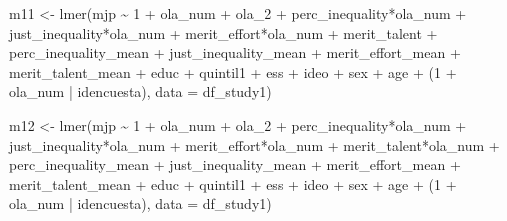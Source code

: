 \documentclass[
  12pt,
  letterpaper,
  DIV=11,
  numbers=noendperiod]{scrartcl}
\newenvironment{Shaded}{\begin{snugshade}}{\end{snugshade}}
\newcommand{\AttributeTok}[1]{\textcolor[rgb]{0.40,0.45,0.13}{#1}}
\newcommand{\DecValTok}[1]{\textcolor[rgb]{0.68,0.00,0.00}{#1}}
\newcommand{\FunctionTok}[1]{\textcolor[rgb]{0.28,0.35,0.67}{#1}}
\newcommand{\NormalTok}[1]{\textcolor[rgb]{0.00,0.23,0.31}{#1}}
\newcommand{\OtherTok}[1]{\textcolor[rgb]{0.00,0.23,0.31}{#1}}
\newcommand{\SpecialCharTok}[1]{\textcolor[rgb]{0.37,0.37,0.37}{#1}}
\begin{document}
\begin{Shaded}
\begin{Highlighting}[]
\NormalTok{m11 }\OtherTok{\textless{}{-}} \FunctionTok{lmer}\NormalTok{(mjp }\SpecialCharTok{\textasciitilde{}} \DecValTok{1} \SpecialCharTok{+}\NormalTok{ ola\_num }\SpecialCharTok{+}\NormalTok{ ola\_2 }\SpecialCharTok{+}\NormalTok{ perc\_inequality}\SpecialCharTok{*}\NormalTok{ola\_num }\SpecialCharTok{+}\NormalTok{ just\_inequality}\SpecialCharTok{*}\NormalTok{ola\_num }\SpecialCharTok{+}\NormalTok{ merit\_effort}\SpecialCharTok{*}\NormalTok{ola\_num }\SpecialCharTok{+}\NormalTok{ merit\_talent }\SpecialCharTok{+}\NormalTok{ perc\_inequality\_mean }\SpecialCharTok{+}\NormalTok{ just\_inequality\_mean }\SpecialCharTok{+}\NormalTok{ merit\_effort\_mean }\SpecialCharTok{+}\NormalTok{ merit\_talent\_mean }\SpecialCharTok{+}\NormalTok{ educ }\SpecialCharTok{+}\NormalTok{ quintil1 }\SpecialCharTok{+}\NormalTok{ ess }\SpecialCharTok{+}\NormalTok{ ideo }\SpecialCharTok{+}\NormalTok{ sex }\SpecialCharTok{+}\NormalTok{ age }\SpecialCharTok{+}\NormalTok{ (}\DecValTok{1} \SpecialCharTok{+}\NormalTok{ ola\_num }\SpecialCharTok{|}\NormalTok{ idencuesta),}
                \AttributeTok{data =}\NormalTok{ df\_study1)}

\NormalTok{m12 }\OtherTok{\textless{}{-}} \FunctionTok{lmer}\NormalTok{(mjp }\SpecialCharTok{\textasciitilde{}} \DecValTok{1} \SpecialCharTok{+}\NormalTok{ ola\_num }\SpecialCharTok{+}\NormalTok{ ola\_2 }\SpecialCharTok{+}\NormalTok{ perc\_inequality}\SpecialCharTok{*}\NormalTok{ola\_num }\SpecialCharTok{+}\NormalTok{ just\_inequality}\SpecialCharTok{*}\NormalTok{ola\_num }\SpecialCharTok{+}\NormalTok{ merit\_effort}\SpecialCharTok{*}\NormalTok{ola\_num }\SpecialCharTok{+}\NormalTok{ merit\_talent}\SpecialCharTok{*}\NormalTok{ola\_num }\SpecialCharTok{+}\NormalTok{ perc\_inequality\_mean }\SpecialCharTok{+}\NormalTok{ just\_inequality\_mean }\SpecialCharTok{+}\NormalTok{ merit\_effort\_mean }\SpecialCharTok{+}\NormalTok{ merit\_talent\_mean }\SpecialCharTok{+}\NormalTok{ educ }\SpecialCharTok{+}\NormalTok{ quintil1 }\SpecialCharTok{+}\NormalTok{ ess }\SpecialCharTok{+}\NormalTok{ ideo }\SpecialCharTok{+}\NormalTok{ sex }\SpecialCharTok{+}\NormalTok{ age }\SpecialCharTok{+}\NormalTok{ (}\DecValTok{1} \SpecialCharTok{+}\NormalTok{ ola\_num }\SpecialCharTok{|}\NormalTok{ idencuesta),}
                \AttributeTok{data =}\NormalTok{ df\_study1)}
\end{Highlighting}
\end{Shaded}
\end{document}

